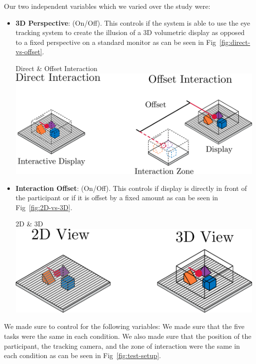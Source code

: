 Our two independent variables which we varied over the study were: 
\begin{itemize}[itemsep=-0.25em]
	\item \textbf{3D Perspective}: (On/Off). This controls if the system is able to use the eye tracking system to create the illusion of a 3D volumetric display as opposed to a fixed perspective on a standard monitor as can be seen in Fig~\ref{fig:direct-vs-offset}.
	\begin{figureBox}[label={fig:direct-vs-offset}, width=0.8\linewidth]{Direct \& Offset Interaction}
		\includegraphics[width = 0.8\linewidth]{./implementation/figures/direct-vs-offset.pdf}
	\end{figureBox}
	\item \textbf{Interaction Offset}: (On/Off). This controls if display is directly in front of the participant or if it is offset by a fixed amount as can be seen in Fig~\ref{fig:2D-vs-3D}.
	\begin{figureBox}[label={fig:2D-vs-3D}, width=0.8\linewidth]{2D \& 3D}
		\includegraphics[width = 0.8\linewidth]{./implementation/figures/2D-vs-3D.pdf}
	\end{figureBox}
	
\end{itemize}

We made sure to control for the following variables: We made sure that the five tasks were the same in each condition. We also made sure that the position of the participant, the tracking camera, and the zone of interaction were the same in each condition as can be seen in Fig~\ref{fig:test-setup}. 


